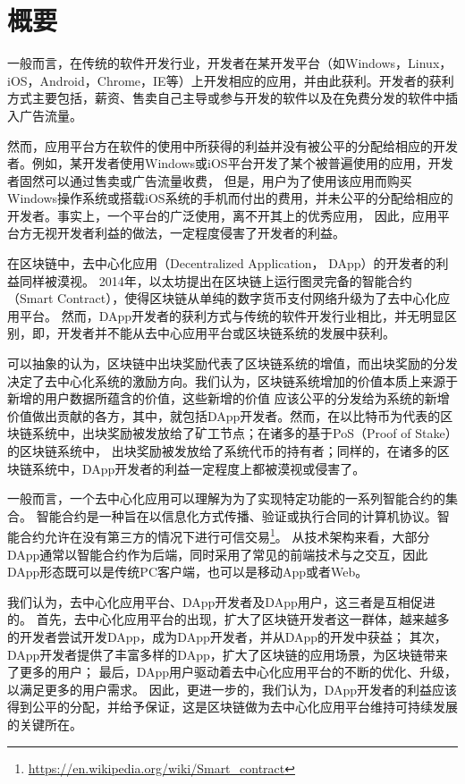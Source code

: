 \section{概要}


一般而言，在传统的软件开发行业，开发者在某开发平台（如Windows，Linux，iOS，Android，Chrome，IE等）上开发相应的应用，并由此获利。开发者的获利方式主要包括，薪资、售卖自己主导或参与开发的软件以及在免费分发的软件中插入广告流量。

然而，应用平台方在软件的使用中所获得的利益并没有被公平的分配给相应的开发者。例如，某开发者使用Windows或iOS平台开发了某个被普遍使用的应用，开发者固然可以通过售卖或广告流量收费，
但是，用户为了使用该应用而购买Windows操作系统或搭载iOS系统的手机而付出的费用，并未公平的分配给相应的开发者。事实上，一个平台的广泛使用，离不开其上的优秀应用，
因此，应用平台方无视开发者利益的做法，一定程度侵害了开发者的利益。

在区块链中，去中心化应用（Decentralized Application， DApp）的开发者的利益同样被漠视。
2014年，以太坊提出在区块链上运行图灵完备的智能合约（Smart Contract），使得区块链从单纯的数字货币支付网络升级为了去中心化应用平台。
然而，DApp开发者的获利方式与传统的软件开发行业相比，并无明显区别，即，开发者并不能从去中心应用平台或区块链系统的发展中获利。

可以抽象的认为，区块链中出块奖励代表了区块链系统的增值，而出块奖励的分发决定了去中心化系统的激励方向。我们认为，区块链系统增加的价值本质上来源于新增的用户数据所蕴含的价值，这些新增的价值
应该公平的分发给为系统的新增价值做出贡献的各方，其中，就包括DApp开发者。然而，在以比特币为代表的区块链系统中，出块奖励被发放给了矿工节点；在诸多的基于PoS（Proof of Stake）的区块链系统中，
出块奖励被发放给了系统代币的持有者；同样的，在诸多的区块链系统中，DApp开发者的利益一定程度上都被漠视或侵害了。

一般而言，一个去中心化应用可以理解为为了实现特定功能的一系列智能合约的集合。
智能合约是一种旨在以信息化方式传播、验证或执行合同的计算机协议。智能合约允许在没有第三方的情况下进行可信交易\footnote{\url{https://en.wikipedia.org/wiki/Smart\_contract}}。
从技术架构来看，大部分DApp通常以智能合约作为后端，同时采用了常见的前端技术与之交互，因此DApp形态既可以是传统PC客户端，也可以是移动App或者Web。

我们认为，去中心化应用平台、DApp开发者及DApp用户，这三者是互相促进的。
首先，去中心化应用平台的出现，扩大了区块链开发者这一群体，越来越多的开发者尝试开发DApp，成为DApp开发者，并从DApp的开发中获益；
其次，DApp开发者提供了丰富多样的DApp，扩大了区块链的应用场景，为区块链带来了更多的用户；
最后，DApp用户驱动着去中心化应用平台的不断的优化、升级，以满足更多的用户需求。
因此，更进一步的，我们认为，DApp开发者的利益应该得到公平的分配，并给予保证，这是区块链做为去中心化应用平台维持可持续发展的关键所在。

